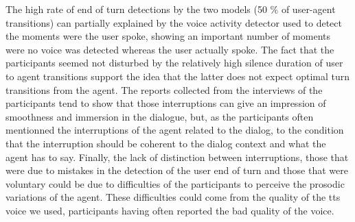 The high rate of end of turn detections by the two models (50 \% of user-agent transitions) can partially explained by the voice activity detector used to detect the moments were the user spoke, showing an important number of moments were no voice was detected whereas the user actually spoke. The fact that the participants seemed not disturbed by the relatively high silence duration of user to agent transitions support the idea that the latter does not expect optimal turn transitions from the agent. The reports collected from the interviews of the participants tend to show that those interruptions can give an impression of smoothness and immersion in the dialogue, but, as the participants often mentionned the interruptions of the agent related to the dialog, to the condition that the interruption should be coherent to the dialog context and what the agent has to say. Finally, the lack of distinction between interruptions, those that were due to mistakes in the detection of the user end of turn and those that were voluntary could be due to difficulties of the participants to perceive the prosodic variations of the agent. These difficulties could come from the quality of the tts voice we used, participants having often reported the bad quality of the voice. 

